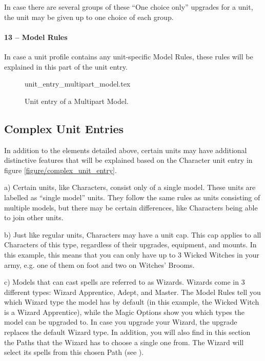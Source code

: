 In case there are several groups of these \enquote{One choice only} upgrades for a unit, the unit may be given up to one choice of each group.

\paragraph{13 -- Model Rules}

In case a unit profile contains any unit-specific Model Rules, these rules will be explained in this part of the unit entry.

\newcommand{\crew}{Crew}
\newcommand{\wingedmonkey}{Winged Monkey}
\newcommand{\chassis}{Chassis}

\begin{figure}[!b]
	\centering
	{unit_entry_multipart_model.tex}\vspace{-10pt}
	\caption{Unit entry of a Multipart Model.}
	\label{figure/unit_entry_multipart_model}
	\vspace*{5cm}
\end{figure}

\subsection{Complex Unit Entries}

In addition to the elements detailed above, certain units may have additional distinctive features that will be explained based on the Character unit entry in figure \ref{figure/complex_unit_entry}.

a) Certain units, like Characters, consist only of a single model. These units are labelled as \enquote{single model} units. They follow the same rules as units consisting of multiple models, but there may be certain differences, like Characters being able to join other units.

b) Just like regular units, Characters may have a unit cap. This cap applies to all Characters of this type, regardless of their upgrades, equipment, and mounts. In this example, this means that you can only have up to 3 Wicked Witches in your army, e.g. one of them on foot and two on Witches' Brooms.

c) Models that can cast spells are referred to as Wizards. Wizards come in 3 different types: Wizard Apprentice, Adept, and Master. The Model Rules tell you which Wizard type the model has by default (in this example, the Wicked Witch is a Wizard Apprentice), while the Magic Options show you which types the model can be upgraded to. In case you upgrade your Wizard, the upgrade replaces the default Wizard type. In addition, you will also find in this section the Paths that the Wizard has to choose a single one from. The Wizard will select its spells from this chosen Path (see ).

